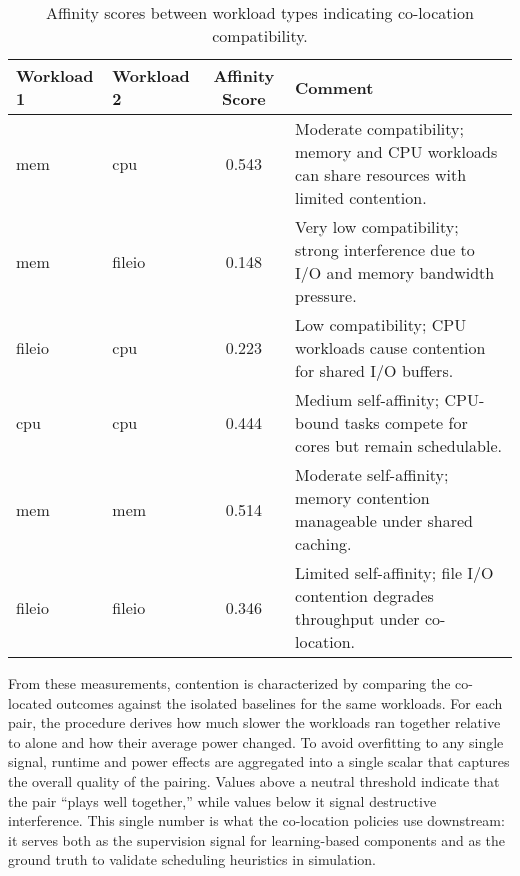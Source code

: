 \begin{table}[H]
    \centering
    \caption{Affinity scores between workload types indicating co-location compatibility.}
    \label{tab:affinity_scores}
    \begin{tabularx}{\textwidth}{l l c X}
        \toprule
        \textbf{Workload 1} & \textbf{Workload 2} & \textbf{Affinity Score} & \textbf{Comment}                                                                              \\
        \midrule
        mem                 & cpu                 & 0.543                   & Moderate compatibility; memory and CPU workloads can share resources with limited contention. \\
        mem                 & fileio              & 0.148                   & Very low compatibility; strong interference due to I/O and memory bandwidth pressure.         \\
        fileio              & cpu                 & 0.223                   & Low compatibility; CPU workloads cause contention for shared I/O buffers.                     \\
        cpu                 & cpu                 & 0.444                   & Medium self-affinity; CPU-bound tasks compete for cores but remain schedulable.               \\
        mem                 & mem                 & 0.514                   & Moderate self-affinity; memory contention manageable under shared caching.                    \\
        fileio              & fileio              & 0.346                   & Limited self-affinity; file I/O contention degrades throughput under co-location.             \\
        \bottomrule
    \end{tabularx}
\end{table}

From these measurements, contention is characterized by comparing the co-located outcomes against the isolated baselines for the same workloads. For each pair, the procedure derives how much slower the workloads ran together relative to alone and how their average power changed. To avoid overfitting to any single signal, runtime and power effects are aggregated into a single scalar that captures the overall quality of the pairing. Values above a neutral threshold indicate that the pair “plays well together,” while values below it signal destructive interference. This single number is what the co-location policies use downstream: it serves both as the supervision signal for learning-based components and as the ground truth to validate scheduling heuristics in simulation.


